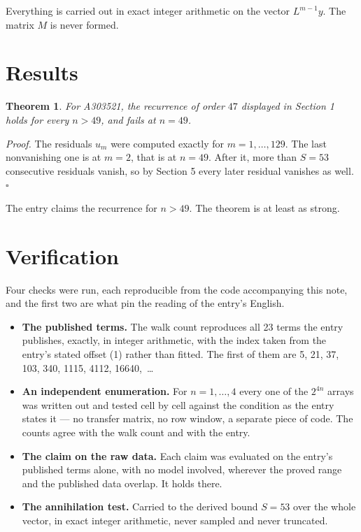 \documentclass[11pt]{article}
\newtheorem{theorem}{Theorem}
\theoremstyle{definition}
\begin{document}
Everything is carried out in exact integer arithmetic on the vector $L^{m-1}y$. The matrix $M$ is never formed.

\section{Results}

\begin{theorem} For A303521, the recurrence of order $47$ displayed in Section 1 holds for every $n > 49$, and fails at $n = 49$.\end{theorem}

{\itshape Proof.} The residuals $u_m$ were computed exactly for $m = 1,\dots,129$. The last nonvanishing one is at $m = 2$, that is at $n = 49$. After it, more than $S = 53$ consecutive residuals vanish, so by Section 5 every later residual vanishes as well. $\square$

The entry claims the recurrence for $n > 49$. The theorem is at least as strong.

\section{Verification}

Four checks were run, each reproducible from the code accompanying this note, and the first two are what pin the reading of the entry's English.

\begin{itemize}

\item {\bfseries The published terms.} The walk count reproduces all 23 terms the entry publishes, exactly, in integer arithmetic, with the index taken from the entry's stated offset (1) rather than fitted. The first of them are 5, 21, 37, 103, 340, 1115, 4112, 16640,~\dots

\item {\bfseries An independent enumeration.} For $n = 1,\dots,4$ every one of the $2^{4n}$ arrays was written out and tested cell by cell against the condition as the entry states it --- no transfer matrix, no row window, a separate piece of code. The counts agree with the walk count and with the entry.

\item {\bfseries The claim on the raw data.} Each claim was evaluated on the entry's published terms alone, with no model involved, wherever the proved range and the published data overlap. It holds there.

\item {\bfseries The annihilation test.} Carried to the derived bound $S = 53$ over the whole vector, in exact integer arithmetic, never sampled and never truncated.

\end{itemize}
\end{document}
